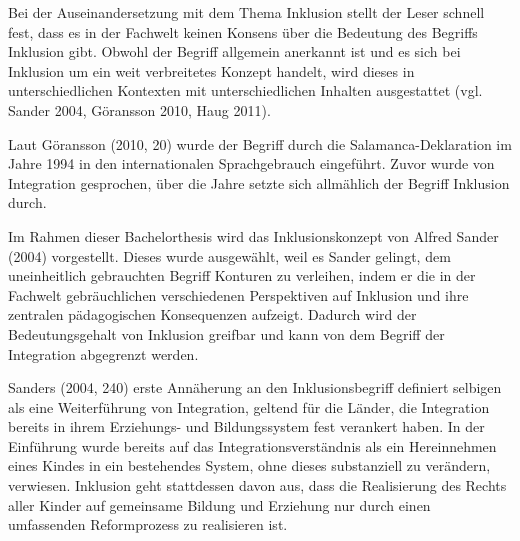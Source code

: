 Bei der Auseinandersetzung mit dem Thema Inklusion stellt der Leser schnell fest, dass es in der Fachwelt keinen Konsens über die Bedeutung des Begriffs Inklusion gibt. Obwohl der Begriff allgemein anerkannt ist und es sich bei Inklusion um ein weit verbreitetes Konzept handelt, wird dieses in unterschiedlichen Kontexten mit unterschiedlichen Inhalten ausgestattet (vgl. Sander 2004, Göransson 2010, Haug 2011). 

Laut Göransson (2010, 20) wurde der Begriff durch die Salamanca-Deklaration im Jahre 1994 in den internationalen Sprachgebrauch eingeführt. Zuvor wurde von Integration gesprochen, über die Jahre setzte sich allmählich der Begriff Inklusion durch.

Im Rahmen dieser Bachelorthesis wird das Inklusionskonzept von Alfred Sander (2004) vorgestellt. Dieses wurde ausgewählt, weil es Sander gelingt, dem uneinheitlich gebrauchten Begriff Konturen zu verleihen, indem er die in der Fachwelt gebräuchlichen verschiedenen Perspektiven auf Inklusion und ihre zentralen pädagogischen Konsequenzen aufzeigt. Dadurch wird der Bedeutungsgehalt von Inklusion greifbar und kann von dem Begriff der Integration abgegrenzt werden.

Sanders (2004, 240) erste Annäherung an den Inklusionsbegriff  definiert selbigen als eine Weiterführung von Integration, geltend für die Länder, die Integration bereits in ihrem Erziehungs- und Bildungssystem fest verankert haben. In der Einführung wurde bereits auf das Integrationsverständnis als ein Hereinnehmen eines Kindes in ein bestehendes System, ohne dieses substanziell zu verändern, verwiesen. Inklusion geht stattdessen davon aus, dass die Realisierung des Rechts aller Kinder auf gemeinsame Bildung und Erziehung nur durch einen umfassenden Reformprozess zu realisieren ist.
 
